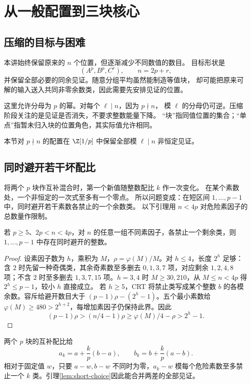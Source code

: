 \chapter{从一般配置到三块核心}\label{sec:compression}

\section{压缩的目标与困难}
本讲始终保留原来的 $n$ 个位置，但逐渐减少不同数值的数目。
目标形状是
\[
(A^p,B^p,C^r),\qquad n=2p+r,
\]
并保留全部必要的同余见证。随意分组平均虽然能制造等值块，
却可能把原来可解的输入送入共同非零余数类，因此需要先安排见证的位置。

这里允许分母为 $p$ 的幂。对每个 $\ell\mid n$，因为 $p\nmid n$，
模 $\ell$ 的分母仍可逆。压缩阶段关注的是见证是否消失，不要求整数能量下降。
“块”指同值位置的集合；“单点”指暂未归入块的位置角色，其实际值允许相同。

本节对 $p\nmid n$ 的配置在 $\Z[1/p]$ 中保留全部模 $\ell\mid n$ 非恒定见证。


\section{同时避开若干坏配比}
将两个 $p$ 块作互补混合时，第一个新值随整数配比 $k$ 作一次变化。
在某个素数处，一个非恒定的一次式至多有一个零点。
所以问题变成：在短区间 $1,\ldots,p-1$ 中，同时避开若干素数各禁止的一个余数类。
以下引理用 $n<4p$ 对危险素因子的总数量作限制。

\begin{lemma}[短区间中的同时避让]\label{lem:short-choice}
若 $p\ge5$、$2p<n<4p$，对 $n$ 的任意一组不同素因子，各禁止一个剩余类，则 $1,\ldots,p-1$ 中存在同时避开的整数。
\end{lemma}
\begin{proof}
设素因子数为 $h$，乘积为 $M$，$\rho=\varphi(M)/M$。对 $h\le4$，长度 $2^h$ 足够：含 $2$ 时先留一种奇偶类，其余奇素数至多删去 $0,1,3,7$ 项，对应剩余 $1,2,4,8$ 项；不含 $2$ 时至多删去 $1,3,7,15$ 项。$h=3,4$ 时 $M\ge30,210$，从 $M\le n<4p$ 得 $2^h\le p-1$，较小 $h$ 直接成立。
若 $h\ge5$，CRT 将禁止类写成某个整数 $b$ 的各模余数。容斥给避开数目大于 $(p-1)\rho-(2^h-1)$。五个最小素数给 $\varphi(M)\ge480>2^{h+2}$，每增加素因子仍保持此界。因此
\[(p-1)\rho>(n/4-1)\rho\ge\varphi(M)/4-\rho>2^h-1.
\]
\end{proof}

两个 $p$ 块的互补配比给
\begin{equation}\label{eq:mix-pair}
a_k=a+\frac{k}{p}(b-a),\qquad b_k=b+\frac{k}{p}(a-b).
\end{equation}
相对于固定值 $w$，只要 $a-w,b-w$ 不同时为零，$a_k-w$ 模每个危险素数至多禁止一个 $k$ 类。引理\ref{lem:short-choice}因此能合并两差的全部见证。


